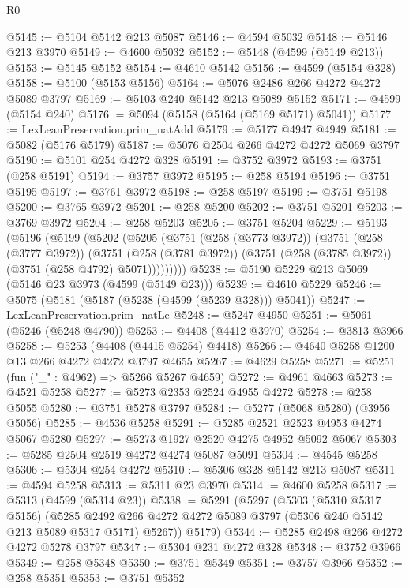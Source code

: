 \begin{lexlean}{R0}
\begin{coremodule}
@5145 := @5104 @5142 @213 @5087
@5146 := @4594 @5032
@5148 := @5146 @213 @3970
@5149 := @4600 @5032
@5152 := @5148 (@4599 (@5149 @213))
@5153 := @5145 @5152
@5154 := @4610 @5142
@5156 := @4599 (@5154 @328)
@5158 := @5100 (@5153 @5156)
@5164 := @5076 @2486 @266 @4272 @4272 @5089 @3797
@5169 := @5103 @240 @5142 @213 @5089 @5152
@5171 := @4599 (@5154 @240)
@5176 := @5094 (@5158 (@5164 (@5169 @5171) @5041))
@5177 := LexLeanPreservation.prim_natAdd
@5179 := @5177 @4947 @4949
@5181 := @5082 (@5176 @5179)
@5187 := @5076 @2504 @266 @4272 @4272 @5069 @3797
@5190 := @5101 @254 @4272 @328
@5191 := @3752 @3972
@5193 := @3751 (@258 @5191)
@5194 := @3757 @3972
@5195 := @258 @5194
@5196 := @3751 @5195
@5197 := @3761 @3972
@5198 := @258 @5197
@5199 := @3751 @5198
@5200 := @3765 @3972
@5201 := @258 @5200
@5202 := @3751 @5201
@5203 := @3769 @3972
@5204 := @258 @5203
@5205 := @3751 @5204
@5229 := @5193
    (@5196
      (@5199
        (@5202
          (@5205
            (@3751
              (@258 (@3773 @3972))
              (@3751
                (@258 (@3777 @3972))
                (@3751
                  (@258 (@3781 @3972))
                  (@3751 (@258 (@3785 @3972)) (@3751 (@258 @4792) @5071)))))))))
@5238 := @5190 @5229 @213 @5069 (@5146 @23 @3973 (@4599 (@5149 @23)))
@5239 := @4610 @5229
@5246 := @5075 (@5181 (@5187 (@5238 (@4599 (@5239 @328))) @5041))
@5247 := LexLeanPreservation.prim_natLe
@5248 := @5247 @4950
@5251 := @5061 (@5246 (@5248 @4790))
@5253 := @4408 (@4412 @3970)
@5254 := @3813 @3966
@5258 := @5253 (@4408 (@4415 @5254) @4418)
@5266 := @4640 @5258 @1200 @13 @266 @4272 @4272 @3797 @4655
@5267 := @4629 @5258
@5271 := @5251 (fun ("_" : @4962) => @5266 @5267 @4659)
@5272 := @4961 @4663
@5273 := @4521 @5258
@5277 := @5273 @2353 @2524 @4955 @4272
@5278 := @258 @5055
@5280 := @3751 @5278 @3797
@5284 := @5277 (@5068 @5280) (@3956 @5056)
@5285 := @4536 @5258
@5291 := @5285 @2521 @2523 @4953 @4274 @5067 @5280
@5297 := @5273 @1927 @2520 @4275 @4952 @5092 @5067
@5303 := @5285 @2504 @2519 @4272 @4274 @5087 @5091
@5304 := @4545 @5258
@5306 := @5304 @254 @4272
@5310 := @5306 @328 @5142 @213 @5087
@5311 := @4594 @5258
@5313 := @5311 @23 @3970
@5314 := @4600 @5258
@5317 := @5313 (@4599 (@5314 @23))
@5338 := @5291
    (@5297
      (@5303
        (@5310 @5317 @5156)
        (@5285 @2492 @266 @4272 @4272 @5089 @3797 (@5306 @240 @5142 @213 @5089 @5317 @5171) @5267))
      @5179)
@5344 := @5285 @2498 @266 @4272 @4272 @5278 @3797
@5347 := @5304 @231 @4272 @328
@5348 := @3752 @3966
@5349 := @258 @5348
@5350 := @3751 @5349
@5351 := @3757 @3966
@5352 := @258 @5351
@5353 := @3751 @5352

\end{coremodule}
\end{lexlean}
